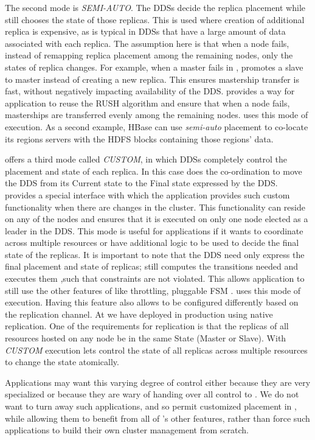 The second \helix mode is \emph{SEMI-AUTO}.  The DDSs decide the replica placement while \helix still chooses 
the state of those replicas. This is used where creation of additional replica
is expensive, as is typical in DDSs that have a large amount of data associated with each replica. 
The assumption here is that when a node fails, instead of remapping replica placement 
 among the remaining nodes, only the states of replica changes. For example, when a master 
fails in \ES, \helix promotes a slave to master instead of creating a new
replica. This ensures mastership transfer is fast,  without negatively impacting
availability of the DDS. \helix provides a way for application to reuse the RUSH algorithm and
ensure that when a node fails, masterships are transferred evenly among
the remaining nodes. \ES uses this mode of execution. As a second example, 
HBase can use \emph{semi-auto} placement to co-locate its regions servers with the HDFS blocks
containing those regions' data.

\helix offers a third mode called \emph{CUSTOM}, in which DDSs completely control the placement and state of each replica. In this 
case \helix does the co-ordination to move the DDS from its Current state to the Final state expressed by the DDS. 
\helix provides a special interface with which the application provides such
custom functionality when there are changes in the cluster.
This functionality can reside on any of the nodes and \helix ensures that it is
executed on only one node elected as a leader in the DDS. This mode is useful
for applications if it wants to coordinate across multiple resources or have additional logic to
be used to decide the final state of the replicas. It is important to note that
the DDS need only express the final placement and state of replicas; \helix
still computes the transitions needed and executes them ,such that constraints are not violated. This allows 
application to still use the other features of \helix like throttling, pluggable FSM \etc. \seas uses this mode of execution. 
Having this feature also allows \ES to be configured differently based on the
replication channel. At \linkedin we have deployed \ES in production using
native \mysql replication.  One of the requirements for \mysql replication 
is that the replicas of all resources hosted on any node be in the
same State (Master or Slave).
With \emph{CUSTOM} execution \helix lets \ES control the state of all replicas 
across multiple resources to change the state atomically.

Applications may want this varying degree of control either because they are very specialized or because they
are wary of handing over all control to \helix.   We do not want to turn away
such applications, and so permit customized placement in \helix, while allowing
them to benefit from all of \helix's other features, rather than 
force such applications to build their own cluster management from scratch.


